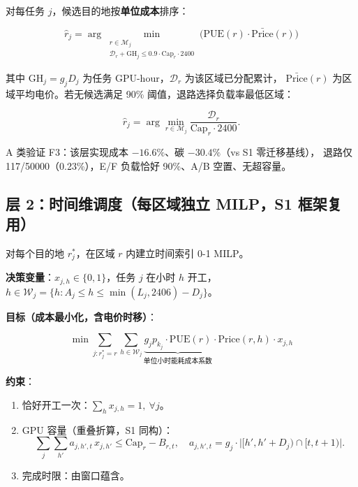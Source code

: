 \documentclass{internal-report}
\begin{document}
对每任务 $j$，候选目的地按\textbf{单位成本}排序：

\begin{equation}
  \hat{r}_j = \arg\min_{\substack{r \in \mathcal{M}_j \\ \mathcal{D}_r + \text{GH}_j \le 0.9 \cdot \text{Cap}_r \cdot 2400}}
  \Big( \text{PUE}(r) \cdot \bar{\text{Price}}(r) \Big)
  \label{eq:assign}
\end{equation}

其中 $\text{GH}_j = g_j D_j$ 为任务 GPU-hour，$\mathcal{D}_r$ 为该区域已分配累计，
$\bar{\text{Price}}(r)$ 为区域平均电价。若无候选满足 90\% 阈值，退路选择负载率最低区域：

\begin{equation}
  \hat{r}_j = \arg\min_{r \in \mathcal{M}_j} \frac{\mathcal{D}_r}{\text{Cap}_r \cdot 2400}.
  \label{eq:fallback}
\end{equation}

A 类验证 F3：该层实现成本 $-16.6\%$、碳 $-30.4\%$（vs S1 零迁移基线），
退路仅 117/50000（0.23\%），E/F 负载恰好 90\%、A/B 空置、无超容量。

\subsection{层 2：时间维调度（每区域独立 MILP，S1 框架复用）}

对每个目的地 $r^*_j$，在区域 $r$ 内建立时间索引 0-1 MILP。

\textbf{决策变量}：$x_{j,h} \in \{0,1\}$，任务 $j$ 在小时 $h$ 开工，
$h \in \mathcal{W}_j = \{h : A_j \le h \le \min(L_j, 2406) - D_j\}$。

\textbf{目标（成本最小化，含电价时移）}：

\begin{equation}
  \min \sum_{j: r^*_j = r} \sum_{h \in \mathcal{W}_j}
  \underbrace{g_j p_{k_j} \cdot \text{PUE}(r)}_{\text{单位小时能耗成本系数}} \cdot
  \text{Price}(r, h) \cdot x_{j,h}
  \label{eq:obj}
\end{equation}

\textbf{约束}：
\begin{enumerate}
  \item 恰好开工一次：$\sum_{h} x_{j,h} = 1,\ \forall j$。
  \item GPU 容量（重叠折算，S1 同构）：
  \begin{equation}
    \sum_{j} \sum_{h'} a_{j,h',t}\, x_{j,h'} \le \text{Cap}_r - B_{r,t},\quad
    a_{j,h',t} = g_j \cdot \big|[h', h'+D_j) \cap [t, t+1)\big|.
    \label{eq:cap}
  \end{equation}
  \item 完成时限：由窗口蕴含。
\end{enumerate}
\end{document}
